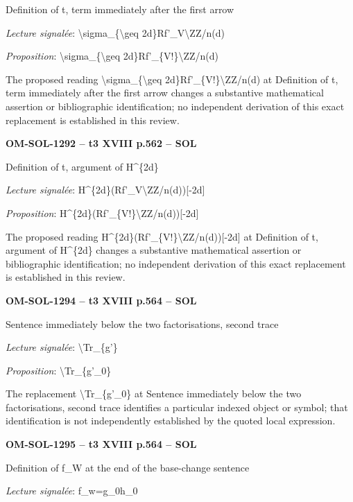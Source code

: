 Definition of t, term immediately after the first arrow\par
\emph{Lecture signalée}: \textbackslash{}sigma\_\{\textbackslash{}geq 2d\}Rf'\_V\textbackslash{}ZZ/n(d)\par
\emph{Proposition}: \textbackslash{}sigma\_\{\textbackslash{}geq 2d\}Rf'\_\{V!\}\textbackslash{}ZZ/n(d)\par
The proposed reading \textbackslash{}sigma\_\{\textbackslash{}geq 2d\}Rf'\_\{V!\}\textbackslash{}ZZ/n(d) at Definition of t, term immediately after the first arrow changes a substantive mathematical assertion or bibliographic identification; no independent derivation of this exact replacement is established in this review.\par
\par\noindent\textbf{OM-SOL-1292 -- t3 XVIII p.562 -- SOL}\par
Definition of t, argument of H\textasciicircum{}\{2d\}\par
\emph{Lecture signalée}: H\textasciicircum{}\{2d\}(Rf'\_V\textbackslash{}ZZ/n(d))[-2d]\par
\emph{Proposition}: H\textasciicircum{}\{2d\}(Rf'\_\{V!\}\textbackslash{}ZZ/n(d))[-2d]\par
The proposed reading H\textasciicircum{}\{2d\}(Rf'\_\{V!\}\textbackslash{}ZZ/n(d))[-2d] at Definition of t, argument of H\textasciicircum{}\{2d\} changes a substantive mathematical assertion or bibliographic identification; no independent derivation of this exact replacement is established in this review.\par
\par\noindent\textbf{OM-SOL-1294 -- t3 XVIII p.564 -- SOL}\par
Sentence immediately below the two factorisations, second trace\par
\emph{Lecture signalée}: \textbackslash{}Tr\_\{g'\}\par
\emph{Proposition}: \textbackslash{}Tr\_\{g'\_0\}\par
The replacement \textbackslash{}Tr\_\{g'\_0\} at Sentence immediately below the two factorisations, second trace identifies a particular indexed object or symbol; that identification is not independently established by the quoted local expression.\par
\par\noindent\textbf{OM-SOL-1295 -- t3 XVIII p.564 -- SOL}\par
Definition of f\_W at the end of the base-change sentence\par
\emph{Lecture signalée}: f\_w=\allowbreak g\_0h\_0\par
